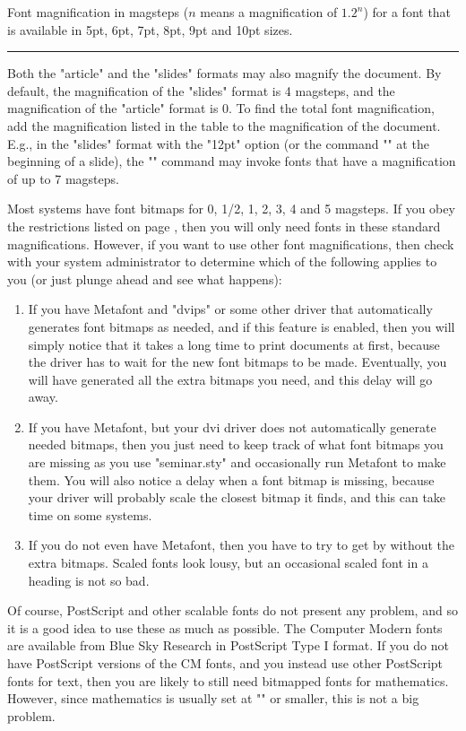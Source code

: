 \begin{slide}
\begin{table}
\begin{center}
\caption{Font magnification in magsteps ($n$ means a magnification of $1.2^n$)
for a font that is available in 5pt, 6pt, 7pt, 8pt, 9pt and 10pt
sizes.\label{font-mag}}
\end{center}
\hrule  height 1pt\relax
\end{table}

Both the "article" and the "slides" formats may also magnify the document. By
default, the magnification of the "slides" format is 4 magsteps, and the
magnification of the "article" format is 0. To find the total font
magnification, add the magnification listed in the table to the magnification
of the document. E.g., in the "slides" format with the "12pt" option (or the
command "" at the beginning of a slide), the "\large" command may
invoke fonts that  have a magnification of up to 7 magsteps.

Most systems have font bitmaps for 0, 1/2, 1, 2, 3, 4 and 5 magsteps. If you
obey the restrictions listed on page \pageref{font-res}, then you will only
need fonts in these standard magnifications. However, if you want to use other
font magnifications, then check with your system administrator to determine
which of the following applies to you (or just plunge ahead and see what
happens):
\begin{enumerate}
\item If you have Metafont and "dvips" or some other driver that automatically
generates font bitmaps as needed, and if this feature is enabled, then you
will simply notice that it takes a long time to print documents at first,
because the driver has to wait for the new font bitmaps to be made.
Eventually, you will have generated all the extra bitmaps you need, and this
delay will go away.
\item If you have Metafont, but your dvi driver does not automatically
generate needed bitmaps, then you just need to keep track of what font bitmaps
you are missing as you use "seminar.sty" and occasionally run Metafont to make
them. You will also notice a delay when a font bitmap is missing, because your
driver will probably scale the closest bitmap it finds, and this can take time
on some systems.
\item If you do not even have Metafont, then you have to try to get by without
the extra bitmaps. Scaled fonts look lousy, but an occasional scaled font in a
heading is not so bad.
\end{enumerate}

Of course, PostScript and other scalable fonts do not present any problem, and
so it is a good idea to use these as much as possible. The Computer Modern
fonts are available from Blue Sky Research in PostScript Type I format. If you
do not have PostScript versions of the CM fonts, and you instead use other
PostScript fonts for text, then you are likely to still need bitmapped fonts
for mathematics. However, since mathematics is usually set at "\normalsize" or
smaller, this is not a big problem.


\end{slide}
